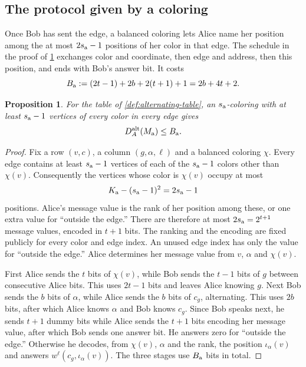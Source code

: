 \documentclass[11pt,letterpaper]{article} \usepackage[utf8]{inputenc}
\theoremstyle{plain} \newtheorem{theorem}{Theorem}[section]
\newtheorem{proposition}[proposition]{Proposition}
\theoremstyle{definition} \newaliascnt{definition}{theorem}
\begin{document}
\subsection{The protocol given by a coloring}

Once Bob has sent the edge, a balanced coloring lets Alice name her
position among the at most $2s_{\rm a}-1$ positions of her color in that edge. The schedule in the proof of
\cref{prop:alternating-upper} exchanges color and coordinate, then edge and
address, then this position, and ends with Bob's answer bit. It costs
\[
B_{\rm a}:=(2t-1)+2b+2(t+1)+1=2b+4t+2.
\]

\begin{proposition}\label{prop:alternating-upper}
For the table of \cref{def:alternating-table}, an $s_{\rm a}$-coloring with at
least $s_{\rm a}-1$ vertices of every color in every edge gives
\[
D_A^{\rm alt}(M_{\rm a})\le B_{\rm a}.
\]
\end{proposition}
\begin{proof}
Fix a row $(v,c)$, a column $(g,\alpha,\ell)$ and a balanced coloring $\chi$.
Every edge contains at least
$s_{\rm a}-1$ vertices of each of the $s_{\rm a}-1$ colors other than $\chi(v)$. Consequently
the vertices whose color is $\chi(v)$ occupy at most
\[
K_{\rm a}-(s_{\rm a}-1)^2=2s_{\rm a}-1
\]
positions.
Alice's message value is the rank of her position among these, or one
extra value for ``outside the edge.'' There are therefore at most
$2s_{\rm a}=2^{t+1}$ message values, encoded in $t+1$ bits. The ranking and the encoding are fixed publicly
for every color and edge index. An unused edge index has only the value for ``outside the edge.''
Alice determines her message value from $v$, $\alpha$ and $\chi(v)$.

First Alice sends the $t$ bits of $\chi(v)$, while Bob sends
the $t-1$ bits of $g$ between consecutive Alice bits. This uses $2t-1$ bits and
leaves Alice knowing $g$. Next Bob sends the $b$ bits of $\alpha$, while Alice
sends the $b$ bits of $c_g$, alternating. This uses $2b$ bits, after which
Alice knows $\alpha$ and Bob knows $c_g$. Since Bob speaks next, he sends $t+1$ dummy bits while Alice sends
the $t+1$ bits encoding her message value, after which Bob sends one answer bit. He answers zero for
``outside the edge.'' Otherwise he decodes, from $\chi(v)$, $\alpha$ and the rank, the position
$\iota_\alpha(v)$ and answers $w^\ell(c_g,\iota_\alpha(v))$. The three
stages use $B_{\rm a}$ bits in total.
\end{proof}
\end{document}
